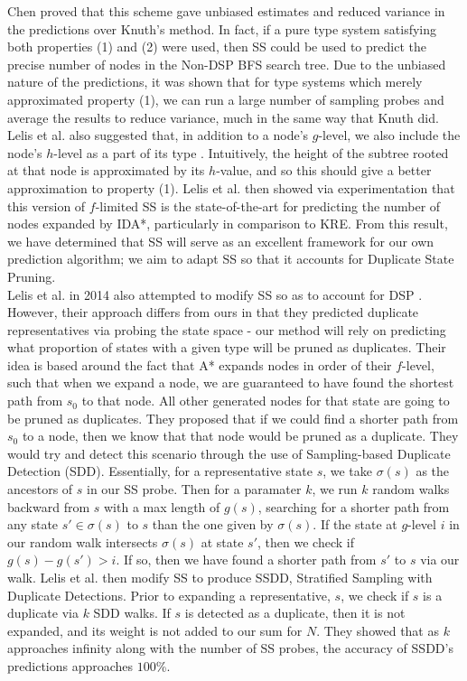 \documentclass{article}
\begin{document}
Chen proved that this scheme gave unbiased estimates and reduced variance in the predictions over Knuth's method.
In fact, if a pure type system satisfying both properties (1) and (2) were used,
then SS could be used to predict the precise number of nodes in the Non-DSP BFS search tree.
Due to the unbiased nature of the predictions, it was shown that for type systems which merely approximated property (1),
we can run a large number of sampling probes and average the results to reduce variance,
much in the same way that Knuth did.
Lelis et al. also suggested that, in addition to a node's \(g\)-level, we also include the node's \(h\)-level
as a part of its type \cite{lelis2013predicting}. Intuitively, the height of the subtree rooted at that
node is approximated by its \(h\)-value, and so this should give a better approximation to property (1).
Lelis et al. then showed via experimentation that this version of \(f\)-limited SS
is the state-of-the-art for predicting the number of nodes expanded by IDA*, particularly in comparison to KRE.
From this result, we have determined that SS will serve as an excellent framework for our own prediction algorithm;
we aim to adapt SS so that it accounts for Duplicate State Pruning. \\

Lelis et al. in 2014 also attempted to modify SS so as to account for DSP \cite{lelis2014estimating}.
However, their approach differs from ours in that they predicted duplicate representatives via
probing the state space - our method will rely on predicting what proportion of states with a given type
will be pruned as duplicates.
Their idea is based around the fact that A* expands nodes in order of their \(f\)-level, such that
when we expand a node, we are guaranteed to have found the shortest path from \(s_0\) to that node. All other
generated nodes for that state are going to be pruned as duplicates.
They proposed that if we could find a shorter path from \(s_0\) to a node,
then we know that that node would be pruned as a duplicate.
They would try and detect this scenario through the use of Sampling-based Duplicate Detection (SDD).
Essentially, for a representative state \(s\), we take \(\sigma(s)\) as the ancestors of \(s\) in our SS probe.
Then for a paramater \(k\), we run \(k\) random walks backward from \(s\) with a max length of \(g(s)\),
searching for a shorter path from any state \(s' \in \sigma(s)\) to \(s\) than the one given by \(\sigma(s)\).
If the state at \(g\)-level \(i\) in our random walk intersects \(\sigma(s)\) at state \(s'\),
then we check if \(g(s) - g(s') > i\). If so, then we have found a shorter path from \(s'\) to \(s\) via
our walk. Lelis et al. then modify SS to produce SSDD, Stratified Sampling with Duplicate Detections.
Prior to expanding a representative, \(s\), we check if \(s\) is a duplicate via \(k\) SDD walks.
If \(s\) is detected as a duplicate, then it is not expanded, and its weight is not added to our sum for \(N\).
They showed that as \(k\) approaches infinity along with the number of SS probes,
the accuracy of SSDD's predictions approaches \(100\)\%. \\
\end{document}
